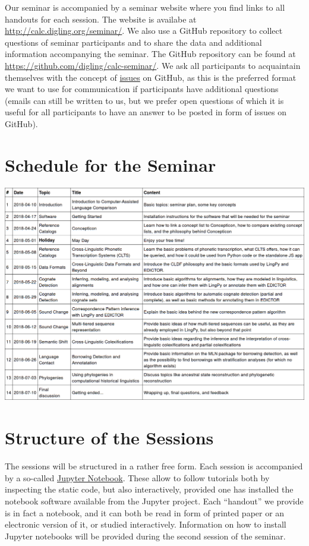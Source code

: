 Our seminar is accompanied by a seminar website where you find links to
all handouts for each session. The website is availabe at
\url{http://calc.digling.org/seminar/}. We also use a GitHub repository
to collect questions of seminar participants and to share the data and
additional information accompanying the seminar. The GitHub repository
can be found at \url{https://github.com/digling/calc-seminar/}. We ask
all participants to acquaintain themselves with the concept of
\href{https://github.com/digling/calc-seminar/issues}{issues} on GitHub,
as this is the preferred format we want to use for communication if
participants have additional questions (emails can still be written to
us, but we prefer open questions of which it is useful for all
participants to have an answer to be posted in form of issues on
GitHub).

\section{Schedule for the Seminar}\label{schedule-for-the-seminar}
\begin{center}
\includegraphics[width=\textwidth]{img/s1-table.png}
\end{center}

\section{Structure of the Sessions}\label{structure-of-the-sessions}

The sessions will be structured in a rather free form. Each session is
accompanied by a so-called \href{http://jupyter.org/}{Jupyter Notebook}.
These allow to follow tutorials both by inspecting the static code, but
also interactively, provided one has installed the notebook software
available from the Jupyter project. Each ``handout'' we provide is in
fact a notebook, and it can both be read in form of printed paper or an
electronic version of it, or studied interactively. Information on how
to install Jupyter notebooks will be provided during the second session
of the seminar.

